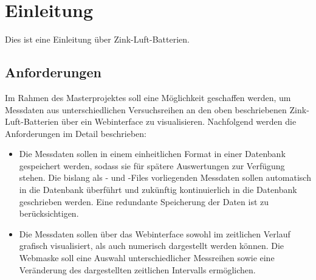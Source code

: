 \chapter{Einleitung}\label{ch:einleitung}


Dies ist eine Einleitung über Zink-Luft-Batterien.


\section{Anforderungen}

Im Rahmen des Masterprojektes soll eine Möglichkeit geschaffen werden, um Messdaten aus unterschiedlichen Versuchsreihen an den oben beschriebenen Zink-Luft-Batterien über ein Webinterface zu visualisieren. Nachfolgend werden die Anforderungen im Detail beschrieben:

\begin{itemize}

\item Die Messdaten sollen in einem einheitlichen Format in einer Datenbank gespeichert werden, sodass sie für spätere Auswertungen zur Verfügung stehen. Die bislang als - und -Files vorliegenden Messdaten sollen automatisch in die Datenbank überführt und zukünftig kontinuierlich in die Datenbank geschrieben werden. Eine redundante Speicherung der Daten ist zu berücksichtigen.

\item Die Messdaten sollen über das Webinterface sowohl im zeitlichen Verlauf grafisch visualisiert, als auch numerisch dargestellt werden können. Die Webmaske soll eine Auswahl unterschiedlicher Messreihen sowie eine Veränderung des dargestellten zeitlichen Intervalls ermöglichen.

\end{itemize}

